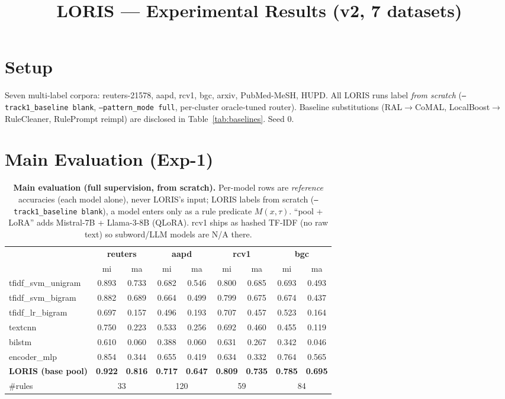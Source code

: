 \documentclass[11pt]{article}
\title{LORIS --- Experimental Results (v2, 7 datasets)}\date{}
\newcommand{\bld}[1]{\textbf{#1}}\newcommand{\gn}[1]{\textcolor{blue}{#1}}
\begin{document}
\maketitle
\section{Setup}
Seven multi-label corpora: reuters-21578, aapd, rcv1, bgc, arxiv, PubMed-MeSH, HUPD.
All LORIS runs label \emph{from scratch} (\texttt{--track1\_baseline blank},
\texttt{--pattern\_mode full}, per-cluster oracle-tuned router). Baseline substitutions
(RAL$\to$CoMAL, LocalBoost$\to$RuleCleaner, RulePrompt reimpl) are disclosed in
Table~\ref{tab:baselines}. Seed 0.
\section{Main Evaluation (Exp-1)}
\begin{table}[h]\centering\footnotesize\setlength{\tabcolsep}{4pt}
\caption{\textbf{Main evaluation (full supervision, from scratch).} Per-model rows are
\emph{reference} accuracies (each model alone), never LORIS's input; LORIS labels from
scratch (\texttt{--track1\_baseline blank}), a model enters only as a rule predicate
$M(x,\tau)$. ``pool + LoRA'' adds Mistral-7B + Llama-3-8B (QLoRA). rcv1 ships as hashed
TF-IDF (no raw text) so subword/LLM models are N/A there.}
\label{tab:big}
\begin{tabular}{lcccccccc}
\toprule
 & \multicolumn{2}{c}{\textbf{reuters}} & \multicolumn{2}{c}{\textbf{aapd}} & \multicolumn{2}{c}{\textbf{rcv1}} & \multicolumn{2}{c}{\textbf{bgc}} \\
\cmidrule(lr){2-3}\cmidrule(lr){4-5}\cmidrule(lr){6-7}\cmidrule(lr){8-9}
 & mi & ma & mi & ma & mi & ma & mi & ma \\
\midrule
\quad tfidf\_svm\_unigram & 0.893 & 0.733 & 0.682 & 0.546 & 0.800 & 0.685 & 0.693 & 0.493 \\
\quad tfidf\_svm\_bigram & 0.882 & 0.689 & 0.664 & 0.499 & 0.799 & 0.675 & 0.674 & 0.437 \\
\quad tfidf\_lr\_bigram & 0.697 & 0.157 & 0.496 & 0.193 & 0.707 & 0.457 & 0.523 & 0.164 \\
\quad textcnn & 0.750 & 0.223 & 0.533 & 0.256 & 0.692 & 0.460 & 0.455 & 0.119 \\
\quad bilstm & 0.610 & 0.060 & 0.388 & 0.060 & 0.631 & 0.267 & 0.342 & 0.046 \\
\quad encoder\_mlp & 0.854 & 0.344 & 0.655 & 0.419 & 0.634 & 0.332 & 0.764 & 0.565 \\
\midrule
\rowcolor{blue!8}\bld{\quad LORIS (base pool)} & \bld{0.922} & \bld{0.816} & \bld{0.717} & \bld{0.647} & \bld{0.809} & \bld{0.735} & \bld{0.785} & \bld{0.695} \\
\quad \#rules & \multicolumn{2}{c}{33} & \multicolumn{2}{c}{120} & \multicolumn{2}{c}{59} & \multicolumn{2}{c}{84} \\
\bottomrule
\end{tabular}
\end{table}
\end{document}
